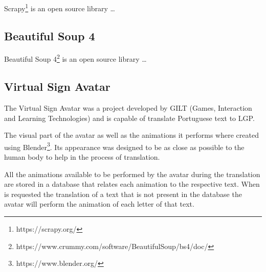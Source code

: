 Scrapy\footnote{https://scrapy.org/} is an open source library \dots

\subsection{Beautiful Soup 4}

Beautiful Soup 4\footnote{https://www.crummy.com/software/BeautifulSoup/bs4/doc/} is an open source library \dots

\subsection{Virtual Sign Avatar}

The Virtual Sign Avatar\cite{escudeiro2015virtual} was a project developed by GILT (Games, Interaction and Learning Technologies) and is capable of translate Portuguese text to \gls{LGP}.

The visual part of the avatar as well as the animations it performs where created using Blender\footnote{https://www.blender.org/}.
Its appearance was designed to be as close as possible to the human body to help in the process of translation.

All the animations available to be performed by the avatar during the translation are stored in a database that relates each animation to the respective text.
When is requested the translation of a text that is not present in the database the avatar will perform the animation of each letter of that text.

